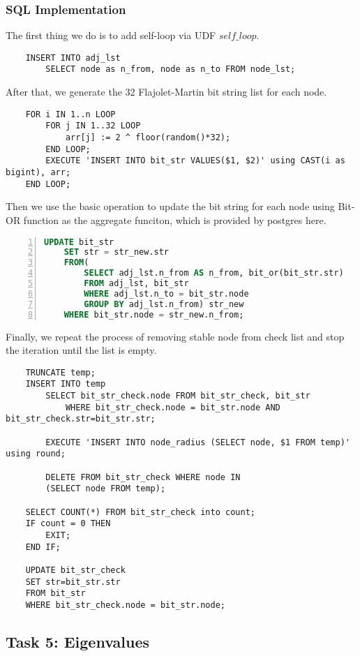 \subsubsection{SQL Implementation}
The first thing we do is to add self-loop via UDF $self\_loop$.
\begin{verbatim}
	INSERT INTO adj_lst 
		SELECT node as n_from, node as n_to FROM node_lst;
\end{verbatim}
After that, we generate the 32 Flajolet-Martin bit string list for each node.
\begin{verbatim}
	FOR i IN 1..n LOOP
		FOR j IN 1..32 LOOP
			arr[j] := 2 ^ floor(random()*32);
		END LOOP;
		EXECUTE 'INSERT INTO bit_str VALUES($1, $2)' using CAST(i as bigint), arr;
	END LOOP;
\end{verbatim}
Then we use the basic operation to update the bit string for each node using Bit-OR function as the aggregate funciton, which is provided by postgres here.
\begin{lstlisting}[caption=Radius, label=rd, language=SQL, numbers=left, numberstyle=\tiny, breaklines, tabsize=2, frame=single, keepspaces=false]
	UPDATE bit_str
	SET str = str_new.str
	FROM(
		SELECT adj_lst.n_from AS n_from, bit_or(bit_str.str)
		FROM adj_lst, bit_str
		WHERE adj_lst.n_to = bit_str.node
		GROUP BY adj_lst.n_from) str_new
	WHERE bit_str.node = str_new.n_from;
\end{lstlisting}
Finally, we repeat the process of removing stable node from check list and stop the iteration until the list is empty.
\begin{verbatim}
	TRUNCATE temp;
	INSERT INTO temp
		SELECT bit_str_check.node FROM bit_str_check, bit_str 
			WHERE bit_str_check.node = bit_str.node AND bit_str_check.str=bit_str.str;

		EXECUTE 'INSERT INTO node_radius (SELECT node, $1 FROM temp)' using round;

		DELETE FROM bit_str_check WHERE node IN 
		(SELECT node FROM temp);

	SELECT COUNT(*) FROM bit_str_check into count;
	IF count = 0 THEN
		EXIT;
	END IF;

	UPDATE bit_str_check 
	SET str=bit_str.str
	FROM bit_str
	WHERE bit_str_check.node = bit_str.node;
\end{verbatim}


\subsection{Task 5: Eigenvalues}
